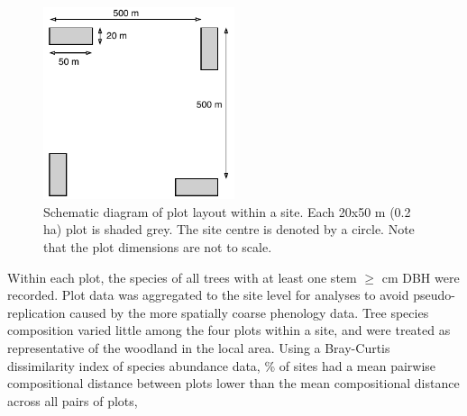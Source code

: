 \documentclass[11pt,a4paper]{article}
\begin{document}
\begin{figure}[H]
\centering
	\includegraphics[width=0.5\textwidth]{schematic.drawio}
	\caption{Schematic diagram of plot layout within a site. Each 20x50 m (0.2 ha) plot is shaded grey. The site centre is denoted by a circle. Note that the plot dimensions are not to scale.}
	\label{schematic}
\end{figure}

Within each plot, the species of all trees with at least one stem $\geq$\stemSize{} cm DBH were recorded. Plot data was aggregated to the site level for analyses to avoid pseudo-replication caused by the more spatially coarse phenology data. Tree species composition varied little among the four plots within a site, and were treated as representative of the woodland in the local area. Using a Bray-Curtis dissimilarity index of species abundance data, \plotDistPer{}\% of sites had a mean pairwise compositional distance between plots lower than the mean compositional distance across all pairs of plots, 
\end{document}
